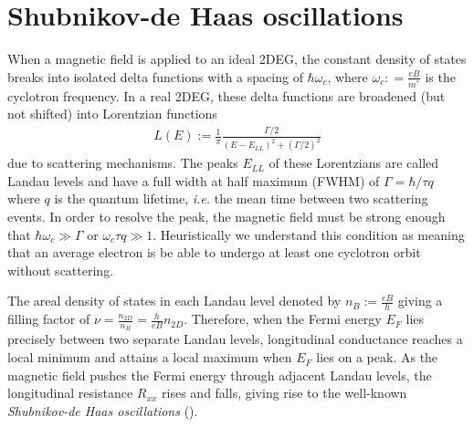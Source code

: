 \documentclass[12pt]{ruthesis}
\begin{document}
\section{Shubnikov-de Haas oscillations}\label{SdHO}
When a magnetic field is applied to an ideal 2DEG, the constant density of states breaks into isolated delta functions with a spacing of $\hbar\omega_{c}$, where $\omega_{c}: =\frac{eB}{m^{*}}$ is the cyclotron frequency.
In a real 2DEG, these delta functions are broadened (but not shifted) into Lorentzian functions
\begin{align}
L(E) := \frac{1}{\pi} \frac{\Gamma/2}{(E - E_{LL})^{2} + (\Gamma/2)^{2}}
\end{align}
due to scattering mechanisms.
The peaks $E_{LL}$ of these Lorentzians are called Landau levels and have a full width at half maximum (FWHM) of $\Gamma=\hbar/\tau q$ where $q$ is the quantum lifetime, \emph{i.e.\!} the mean time between two scattering events.
In order to resolve the peak, the magnetic field must be strong enough that $\hbar\omega_{c}\gg \Gamma$ or $\omega_{c}\tau q \gg 1$.
Heuristically we understand this condition as meaning that an average electron is be able to undergo at least one cyclotron orbit without scattering.

The areal density of states in each Landau level denoted by $n_{B} :=\frac{eB}{h}$ giving a filling factor of $\nu =\frac{n_{2D}}{n_{B}}=\frac{h}{eB}n_{2D}$.
Therefore, when the Fermi energy $E_{F}$ lies precisely between two separate Landau levels, longitudinal conductance reaches a local minimum and attains a local maximum when $E_{F}$ lies on a peak.
As the magnetic field pushes the Fermi energy through adjacent Landau levels, the longitudinal resistance $R_{xx}$ rises and falls, giving rise to the well-known \emph{Shubnikov-de Haas oscillations} ().
\end{document}
